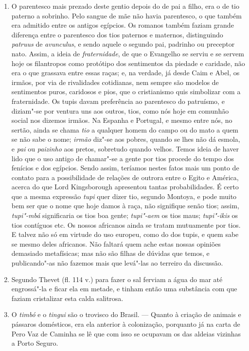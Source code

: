\begin{enumerate}
\item O parentesco mais prezado deste gentio depois do de pai a filho, era o de tio 
paterno a sobrinho. Pelo sangue de mãe não havia parentesco, o que também era 
admitido entre os antigos egípcios. Os romanos também faziam grande diferença entre 
o parentesco dos tios paternos e maternos, distinguindo \textit{patruus} de \textit{avunculus}, e sendo 
aquele o segundo pai, padrinho ou preceptor nato. Assim, a ideia de \textit{fraternidade}, de 
que o Evangelho se serviu e se servem hoje os filantropos como protótipo dos 
sentimentos da piedade e caridade, não era o que grassava entre essas raças; e, na 
verdade, já desde Caim e Abel, os irmãos, por via de rivalidades cotidianas, nem 
sempre são modelos de sentimentos puros, caridosos e pios, que o cristianismo quis 
simbolizar com a fraternidade. Os tupis davam preferência ao parentesco do patruísmo, 
e diziam"-se por ventura uns aos outros, tios, como nós hoje em comunhão social nos 
dizemos irmãos. Na Espanha e Portugal, e mesmo entre nós, no sertão, ainda se chama 
\textit{tio} a qualquer homem do campo ou do mato a quem se não sabe o nome; \textit{irmão} diz"-se 
aos pobres, quando se lhes não dá esmola, e \textit{pai} ou \textit{paizinho} aos pretos, sobretudo 
quando velhos. Temos ideia de haver lido que o uso antigo de chamar"-se a gente por 
tios procede do tempo dos fenícios e dos egípcios. Sendo assim, teríamos nestes 
fatos mais um ponto de contato para a possibilidade de relações de outrora entre o Egito 
e América, acerca do que Lord Kingsborough apresentou tantas probabilidades. É certo 
que a mesma expressão \textit{tupi} quer dizer tio, segundo Montoya, e pode muito bem ser 
que o nome que hoje damos à raça, não signifique senão tios; assim, \textit{tupi"-mbá} 
significaria os tios boa gente;  \textit{tupi"-aem} os tios maus; \textit{tupi"-ikis} os tios contíguos etc. 
Os nossos africanos ainda se tratam mutuamente por tios. E talvez não só em virtude do 
uso europeu, como do dos tupis, e quem sabe se mesmo deles africanos. Não faltará 
quem ache estas nossas opiniões demasiado metafísicas; mas não são filhas de dúvidas 
que temos, e publicando"-as não fazemos mais que levá"-las ao terreiro da discussão.

\item Segundo Thevet (fl. 114 v.) para fazer o sal ferviam a água do mar até engrossá"-la 
e ficar ela em metade, e tinham então uma substância com que faziam cristalizar esta 
calda salitrosa.

\item O \textit{timbó} e o \textit{tingui} são o trovisco do Brasil. --- Quanto à criação de animais e 
pássaros domésticos, era ela anterior à colonização, porquanto já na carta de Pero Vaz 
de Caminha se lê que com isso se ocupavam os das aldeias vizinhas a Porto Seguro.


\end{enumerate}
